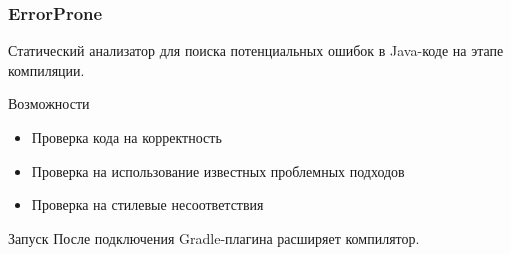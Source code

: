 \documentclass{beamer}
\begin{document}
\begin{frame}
    \frametitle{ErrorProne}
    Статический анализатор для поиска потенциальных ошибок в Java-коде на этапе
    компиляции.
    \begin{block}{Возможности}
        \begin{itemize}
            \item{Проверка кода на корректность}
            \item{Проверка на использование известных проблемных подходов}
            \item{Проверка на стилевые несоответствия}
        \end{itemize}
    \end{block}
    \begin{block}{Запуск}
        После подключения Gradle-плагина расширяет компилятор.
    \end{block}
\end{frame}
\end{document}
